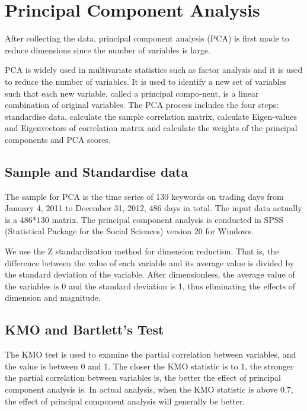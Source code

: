 \documentclass[review,3p,times,12pt,number]{elsarticle}
\begin{document}
\section{Principal Component Analysis}
\label{sec:weibo:PCA}
After collecting the data, principal component analysis (PCA) is first made to reduce dimensions since the number of variables is large.

PCA is widely used in multivariate statistics such as factor analysis and it is used to reduce the number of variables.
It is used to identify a new set of variables such that each new variable, called a principal compo-nent, is a linear combination of original variables.
The PCA process includes the four steps: standardise data, calculate the sample correlation matrix, calculate Eigen-values and Eigenvectors of correlation matrix and calculate the weights of the principal components and PCA scores.

\subsection{Sample and Standardise data}
The sample for PCA is the time series of 130 keywords on trading days from January 4, 2011 to December 31, 2012, 486 days in total.
The input data actually is a 486*130 matrix.
The principal component analysis is conducted in SPSS (Statistical Package for the Social Sciences) version 20 for Windows.

We use the Z standardization method for dimension reduction. That is, the difference between the value of each variable and its average value is divided by the standard deviation of the variable. After dimensionless, the average value of the variables is 0 and the standard deviation is 1, thus eliminating the effects of dimension and magnitude.

\subsection{KMO and Bartlett's Test}
The KMO test is used to examine the partial correlation between variables, and the value is between 0 and 1. The closer the KMO statistic is to 1, the stronger the partial correlation between variables is, the better the effect of principal component analysis is. In actual analysis, when the KMO statistic is above 0.7, the effect of principal component analysis will generally be better.
\end{document}
